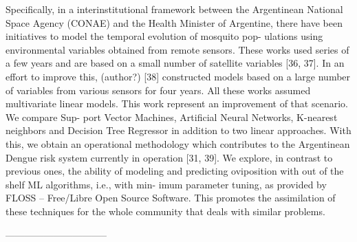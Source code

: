 Specifically, in a interinstitutional framework between the Argentinean
National Space Agency (CONAE) and the Health Minister of Argentine,
there have been initiatives to model the temporal evolution of mosquito pop-
ulations using environmental variables obtained from remote sensors. These
works used series of a few years and are based on a small number of satellite
variables [36, 37]. In an effort to improve this, (author?) [38] constructed
models based on a large number of variables from various sensors for four
years. All these works assumed multivariate linear models.
This work represent an improvement of that scenario. We compare Sup-
port Vector Machines, Artificial Neural Networks, K-nearest neighbors and
Decision Tree Regressor in addition to two linear approaches. With this,
we obtain an operational methodology which contributes to the Argentinean
Dengue risk system currently in operation [31, 39].
We explore, in contrast to previous ones, the ability of modeling and
predicting oviposition with out of the shelf ML algorithms, i.e., with min-
imum parameter tuning, as provided by FLOSS – Free/Libre Open Source
Software. This promotes the assimilation of these techniques for the whole
community that deals with similar problems.



--------------------------------








